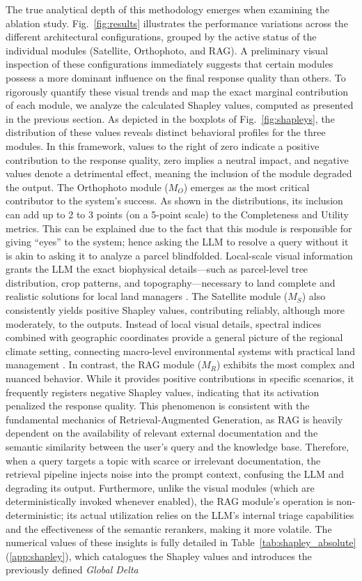 \documentclass[preprint,review,12pt,authoryear]{elsarticle}
\begin{document}
The true analytical depth of this methodology emerges when examining the ablation study. Fig.~\ref{fig:results} illustrates the performance variations across the different architectural configurations, grouped by the active status of the individual modules (Satellite, Orthophoto, and RAG). A preliminary visual inspection of these configurations immediately suggests that certain modules possess a more dominant influence on the final response quality than others. To rigorously quantify these visual trends and map the exact marginal contribution of each module, we analyze the calculated Shapley values, computed as presented in the previous section. As depicted in the boxplots of Fig.~\ref{fig:shapleys}, the distribution of these values reveals distinct behavioral profiles for the three modules. In this framework, values to the right of zero indicate a positive contribution to the response quality, zero implies a neutral impact, and negative values denote a detrimental effect, meaning the inclusion of the module degraded the output. The Orthophoto module ($M_O$) emerges as the most critical contributor to the system's success. As shown in the distributions, its inclusion can add up to 2 to 3 points (on a 5-point scale) to the Completeness and Utility metrics. This can be explained due to the fact that this module is responsible for giving ``eyes'' to the system; hence asking the LLM to resolve a query without it is akin to asking it to analyze a parcel blindfolded. Local-scale visual information grants the LLM the exact biophysical details—such as parcel-level tree distribution, crop patterns, and topography—necessary to land complete and realistic solutions for local land managers \citep{malek2019local}. The Satellite module ($M_S$) also consistently yields positive Shapley values, contributing reliably, although more moderately, to the outputs. Instead of local visual details, spectral indices combined with geographic coordinates provide a general picture of the regional climate setting, connecting macro-level environmental systems with practical land management \citep{cash2000linking}. In contrast, the RAG module ($M_R$) exhibits the most complex and nuanced behavior. While it provides positive contributions in specific scenarios, it frequently registers negative Shapley values, indicating that its activation penalized the response quality. This phenomenon is consistent with the fundamental mechanics of Retrieval-Augmented Generation, as RAG is heavily dependent on the availability of relevant external documentation and the semantic similarity between the user's query and the knowledge base. Therefore, when a query targets a topic with scarce or irrelevant documentation, the retrieval pipeline injects noise into the prompt context, confusing the LLM and degrading its output. Furthermore, unlike the visual modules (which are deterministically invoked whenever enabled), the RAG module's operation is non-deterministic; its actual utilization relies on the LLM's internal triage capabilities and the effectiveness of the semantic rerankers, making it more volatile. The numerical values of these insights is fully detailed in Table~\ref{tab:shapley_absolute} (\ref{app:shapley}), which catalogues the Shapley values and introduces the previously defined \textit{Global Delta} 
\end{document}
